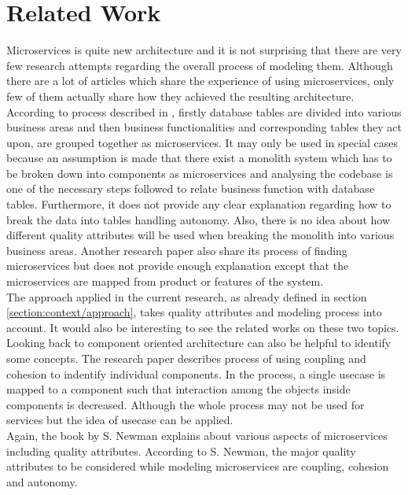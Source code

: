 \chapter{Related Work}\label{chapter:related_work}
Microservices is quite new architecture and it is not surprising that there are very few research attempts regarding the overall process of modeling them. Although there are a lot of articles which share the experience of using microservices, only few of them actually share how they achieved the resulting architecture. According to process described in \cite{Levcovitz:2014aa}, firstly database tables are divided into various business areas and then business functionalities and corresponding tables they act upon, are grouped together as microservices. It may only be used in special cases because an assumption is made that there exist a monolith system which has to be broken down into components as microservices and analysing the codebase is one of the necessary steps followed to relate business function with database tables. Furthermore, it does not provide any clear explanation regarding how to break the data into tables handling autonomy. Also, there is no idea about how different quality attributes will be used when breaking the monolith into various business areas. Another research paper \cite{Bruggemann:2013aa} also share its process of finding microservices but does not provide enough explanation except that the microservices are mapped from product or features of the system.
\\
The approach applied in the current research, as already defined in section \ref{section:context/approach}, takes quality attributes and modeling process into account. It would also be interesting to see the related works on these two topics.\\
Looking back to component oriented architecture can also be helpful to identify some concepts. The research paper \cite{Lee:2001aa} describes process of using coupling and cohesion to indentify individual components. In the process, a single usecase is mapped to a component such that interaction among the objects inside components is decreased. Although the whole process may not be used for services but the idea of usecase can be applied.\\
Again, the book by S. Newman explains about various aspects of microservices including quality attributes. According to S. Newman, the major quality attributes to be considered while modeling microservices are coupling, cohesion and autonomy.\cite{Newman:2015aa}\\

